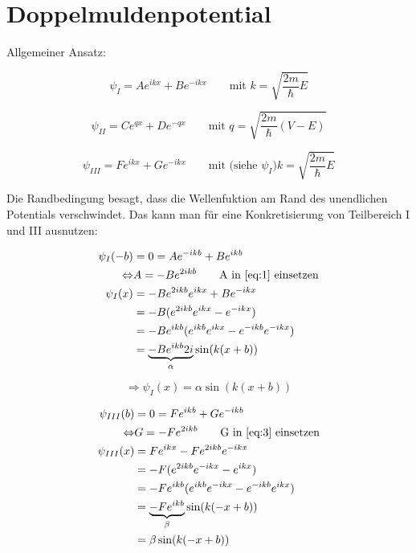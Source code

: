 



\setcounter{section}{1}
\section*{Doppelmuldenpotential}

Allgemeiner Ansatz:

\begin{equation}
  \label{eq:1}
  \psi_I = Ae^{ikx}+Be^{-ikx} \qquad \text{mit } k = \sqrt{\frac{2m}{\hbar}E}
\end{equation}

\begin{equation}
  \label{eq:2}
  \psi_{II} = Ce^{q x}+De^{-qx}\qquad \text{mit } q = \sqrt{\frac{2m}{\hbar}(V-E)}
\end{equation}

\begin{equation}
  \label{eq:3}
  \psi_{III} = Fe^{ikx}+Ge^{-ikx}\qquad \text{mit (siehe }\psi_{I}) k = \sqrt{\frac{2m}{\hbar}E}
\end{equation}


Die Randbedingung besagt, dass die Wellenfuktion am Rand des unendlichen  Potentials verschwindet. Das kann man für eine Konkretisierung von Teilbereich I und III ausnutzen:

\begin{align}
  \label{eq:4}
  \psi_{I}(-b) &= 0 = Ae^{-ikb}+Be^{ikb} \\
\Leftrightarrow & A = -Be^{2ikb}\qquad\text{A in }\ref{eq:1}\text{ einsetzen}\\
\psi_I(x)&=-Be^{2ikb}e^{ikx}+Be^{-ikx} \\
&=-B(e^{2ikb}e^{ikx}-e^{-ikx})\\
&=-B e^{ikb}(e^{ikb}e^{ikx}-e^{-ikb}e^{-ikx})\\
&=\underbrace{-B e^{ikb}2i}_{\alpha}\sin(k(x+b))
\end{align}

\begin{equation}
  \label{eq:5}
  \Rightarrow \psi_I(x)=\alpha\sin(k(x+b))
\end{equation}

\begin{align}
  \label{eq:6}
  \psi_{III}(b) &= 0 = Fe^{ikb}+Ge^{-ikb} \\
\Leftrightarrow & G = -Fe^{2ikb}\qquad\text{G in }\ref{eq:3}\text{ einsetzen}\\
\psi_{III}(x)&=Fe^{ikx} -Fe^{2ikb} e^{-ikx} \\
&=-F(e^{2ikb}e^{-ikx}-e^{ikx})\\
&=-Fe^{ikb}(e^{ikb}e^{-ikx}-e^{-ikb}e^{ikx})\\
&=\underbrace{-Fe^{ikb} }_{\beta}\sin(k(-x+b))\\
&=\beta\sin(k(-x+b))
\end{align}

